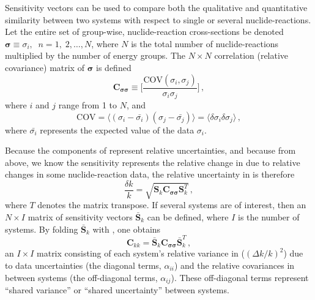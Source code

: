 Sensitivity vectors can be used to compare both the qualitative and 
quantitative similarity between two systems with respect to single or 
several nuclide-reactions. Let the entire set of group-wise, nuclide-reaction 
cross-sections be denoted 
$\bm{\sigma} \equiv \sigma_i, \; \; n = 1,\;2,\ldots,N$, where $N$ is the 
total number of nuclide-reactions multiplied by the number of energy 
groups.  The $N\times N$ correlation (\ie relative covariance) matrix 
of $\bm{\sigma}$ is defined
\begin{equation}
\mathbf{C_{\sigma \sigma}} \equiv \Bigg[\frac{\mathrm{COV}(\sigma_i,\sigma_j)}
                                             {\sigma_i \sigma_j} \Bigg ] \, ,
\end{equation}
where $i$ and $j$ range from 1 to $N$, and 
\begin{equation}
\mathrm{COV} = \langle (\sigma_i - \bar{\sigma_i})(\sigma_j - 
               \bar{\sigma_j}) \rangle 
             = \langle \delta \sigma_i \delta \sigma_j \rangle \, ,
\end{equation}
where $\bar{\sigma_i}$ represents the expected value of the data $\sigma_i$.  

Because the components of \cov represent relative uncertainties, and because 
from above, we know the \keff sensitivity represents the relative change in 
\keff due to relative changes in some nuclide-reaction data, the relative 
uncertainty in \keff is therefore
\begin{equation}
\frac{\delta k}{k} = \sqrt{ \mathbf{S}_k \mathbf{C_{\sigma \sigma}} 
                     \mathbf{S}_k^T } \, ,
\end{equation}
where $T$ denotes the matrix transpose.  If several systems are of interest, 
then an $N \times I$  matrix of sensitivity vectors $\mathbf{\bar{S}}_k$ can 
be defined, where $I$ is the number of systems.  By folding 
$\mathbf{\bar{S}}_k$ with \cov, one obtains
\begin{equation}
 \mathbf{C}_{kk} =  \mathbf{\bar{S}}_k \mathbf{C_{\sigma \sigma}} 
                    \mathbf{\bar{S}}_k^T  \, ,
\label{eq:kunc}
\end{equation}
an $I\times I$ matrix consisting of each system's relative variance in 
\keff (\ie $(\Delta k/k)^2$) due to data uncertainties (the diagonal terms, 
$\alpha_{ii}$) and the relative covariances in \keff between systems 
(the off-diagonal terms, $\alpha_{ij}$).  These off-diagonal terms 
represent ``shared variance'' or ``shared uncertainty'' between systems.  

